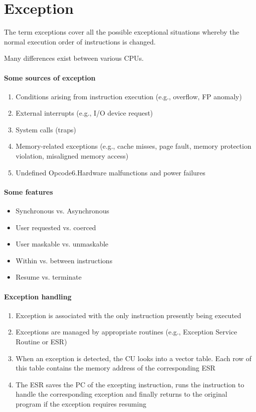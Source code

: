 \section{Exception}
The term exceptions cover all the possible exceptional situations whereby the normal execution order of instructions is changed.

Many differences exist between various CPUs.

\paragraph{Some sources of exception}
\begin{enumerate}
    \item Conditions arising from instruction execution (e.g., overflow, FP anomaly)
    \item External interrupts (e.g., I/O device request)
    \item System calls (traps)
    \item Memory-related exceptions (e.g., cache misses, page fault, memory protection violation, misaligned memory access)
    \item Undefined Opcode6.Hardware malfunctions and power failures
\end{enumerate}

\paragraph{Some features}
\begin{itemize}
    \item Synchronous vs. Asynchronous
    \item User requested vs. coerced
    \item User maskable vs. unmaskable
    \item Within vs. between instructions
    \item Resume vs. terminate
\end{itemize}

\paragraph{Exception handling}
\begin{enumerate}
    \item Exception is associated with the only instruction presently being executed
    \item Exceptions are managed by appropriate routines (e.g., Exception Service Routine or ESR)
    \item When an exception is detected, the CU looks into a vector table. Each row of this table contains the memory address of the corresponding ESR
    \item The ESR saves the PC of the excepting instruction, runs the instruction to handle the corresponding exception and finally returns to the original program if the exception requires resuming 
\end{enumerate}

